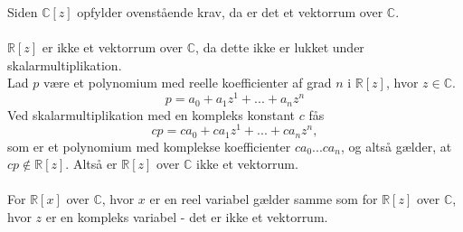 \documentclass[12pt,a4paper]{report}
\begin{document}
Siden $\mathbb{C}[z]$ opfylder ovenstående krav, da er det et vektorrum over $\mathbb{C}$.\\\\
$\mathbb{R}[z]$ er ikke et vektorrum over $\mathbb{C}$, da dette ikke er lukket under skalarmultiplikation.\\
Lad $p$ være et polynomium med reelle koefficienter af grad $n$ i $\mathbb{R}[z]$, hvor $z \in \mathbb{C}$.
\begin{equation}
p=a_0+a_1z^1+...+a_nz^n
\end{equation}
Ved skalarmultiplikation med en kompleks konstant $c$ fås
\begin{equation}
cp=ca_0+ca_1z^1+...+ca_nz^n,
\end{equation}
som er et polynomium med komplekse koefficienter $ca_0...ca_n$, og altså gælder, at $cp \notin \mathbb{R}[z]$. Altså er $\mathbb{R}[z]$ over $\mathbb{C}$ ikke et vektorrum.\\\\
For $\mathbb{R}[x]$ over $\mathbb{C}$, hvor $x$ er en reel variabel gælder samme som for $\mathbb{R}[z]$ over $\mathbb{C}$, hvor $z$ er en kompleks variabel - det er ikke et vektorrum.
\end{document}

